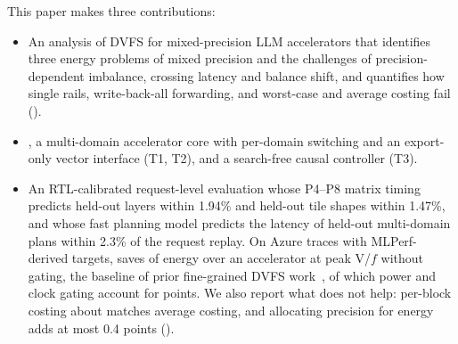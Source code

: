 This paper makes three contributions:
\begin{itemize}
\item An analysis of DVFS for mixed-precision LLM accelerators that identifies three energy problems of mixed precision and the challenges of precision-dependent imbalance, crossing latency and balance shift, and quantifies how single rails, write-back-all forwarding, and worst-case and average costing fail ().
\item \sys{}, a multi-domain accelerator core with per-domain switching and an export-only vector interface (T1, T2), and a search-free causal controller (T3).
\item An RTL-calibrated request-level evaluation whose P4--P8 matrix timing predicts held-out layers within 1.94\% and held-out tile shapes within 1.47\%, and whose fast planning model predicts the latency of held-out multi-domain plans within 2.3\% of the request replay. On Azure traces with MLPerf-derived targets, \sys{} saves  of energy over an accelerator at peak V/$f$ without gating, the baseline of prior fine-grained DVFS work~\cite{xue2026finedvfs}, of which power and clock gating account for  points. We also report what does not help: per-block costing about matches average costing, and allocating precision for energy adds at most 0.4 points ().
\end{itemize}
